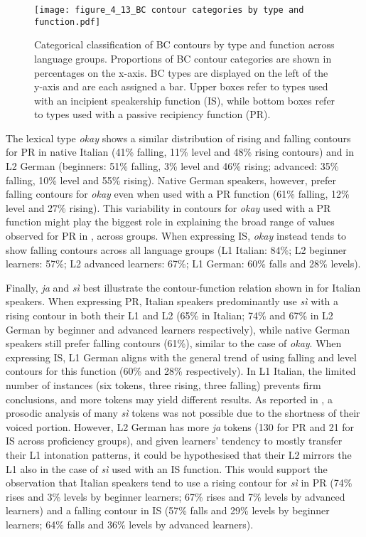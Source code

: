 \begin{figure}[t]
\texttt{[image: figure\_4\_13\_BC contour categories by type and function.pdf]}
 \caption{\label{fig:4.13} Categorical classification of BC contours by type and function across language groups. Proportions of BC contour categories are shown in percentages on the x-axis. BC types are displayed on the left of the y-axis and are each assigned a bar. Upper boxes refer to types used with an incipient speakership function (IS), while bottom boxes refer to types used with a passive recipiency function (PR).}
\end{figure}

The lexical type \textit{okay} shows a similar distribution of rising and falling contours for PR in native Italian (41\% falling, 11\% level and 48\% rising contours) and in L2 German (beginners: 51\% falling, 3\% level and 46\% rising; advanced: 35\% falling, 10\% level and 55\% rising). Native German speakers, however, prefer falling contours for \textit{okay} even when used with a PR function (61\% falling, 12\% level and 27\% rising). This variability in contours for \textit{okay} used with a PR function might play the biggest role in explaining the broad range of values observed for PR in , across groups. When expressing IS, \textit{okay} instead tends to show falling contours across all language groups (L1 Italian: 84\%; L2 beginner learners: 57\%; L2 advanced learners: 67\%; L1 German: 60\% falls and 28\% levels).

Finally, \textit{ja} and \textit{sì} best illustrate the contour-function relation shown in  for Italian speakers. When expressing PR, Italian speakers predominantly use \textit{sì} with a rising contour in both their L1 and L2 (65\% in Italian; 74\% and 67\% in L2 German by beginner and advanced learners respectively), while native German speakers still prefer falling contours (61\%), similar to the case of \textit{okay}. When expressing IS, L1 German aligns with the general trend of using falling and level contours for this function (60\% and 28\% respectively). In L1 Italian, the limited number of instances (six tokens, three rising, three falling) prevents firm conclusions, and more tokens may yield different results. As reported in , a prosodic analysis of many \textit{sì} tokens was not possible due to the shortness of their voiced portion. However, L2 German has more \textit{ja} tokens (130 for PR and 21 for IS across proficiency groups), and given learners’ tendency to mostly transfer their L1 intonation patterns, it could be hypothesised that their L2 mirrors the L1 also in the case of \textit{sì} used with an IS function. This would support the observation that Italian speakers tend to use a rising contour for \textit{sì} in PR (74\% rises and 3\% levels by beginner learners; 67\% rises and 7\% levels by advanced learners) and a falling contour in IS (57\% falls and 29\% levels by beginner learners; 64\% falls and 36\% levels by advanced learners).

